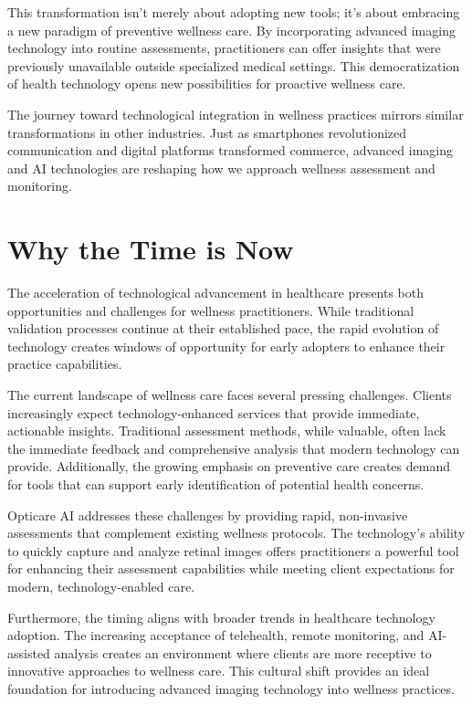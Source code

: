 \documentclass[
  Letterpaper,
]{scrbook}
\begin{document}
This transformation isn't merely about adopting new tools; it's about
embracing a new paradigm of preventive wellness care. By incorporating
advanced imaging technology into routine assessments, practitioners can
offer insights that were previously unavailable outside specialized
medical settings. This democratization of health technology opens new
possibilities for proactive wellness care.

The journey toward technological integration in wellness practices
mirrors similar transformations in other industries. Just as smartphones
revolutionized communication and digital platforms transformed commerce,
advanced imaging and AI technologies are reshaping how we approach
wellness assessment and monitoring.

\section{Why the Time is Now}\label{why-the-time-is-now}

The acceleration of technological advancement in healthcare presents
both opportunities and challenges for wellness practitioners. While
traditional validation processes continue at their established pace, the
rapid evolution of technology creates windows of opportunity for early
adopters to enhance their practice capabilities.

The current landscape of wellness care faces several pressing
challenges. Clients increasingly expect technology-enhanced services
that provide immediate, actionable insights. Traditional assessment
methods, while valuable, often lack the immediate feedback and
comprehensive analysis that modern technology can provide. Additionally,
the growing emphasis on preventive care creates demand for tools that
can support early identification of potential health concerns.

Opticare AI addresses these challenges by providing rapid, non-invasive
assessments that complement existing wellness protocols. The
technology's ability to quickly capture and analyze retinal images
offers practitioners a powerful tool for enhancing their assessment
capabilities while meeting client expectations for modern,
technology-enabled care.

Furthermore, the timing aligns with broader trends in healthcare
technology adoption. The increasing acceptance of telehealth, remote
monitoring, and AI-assisted analysis creates an environment where
clients are more receptive to innovative approaches to wellness care.
This cultural shift provides an ideal foundation for introducing
advanced imaging technology into wellness practices.
\end{document}
